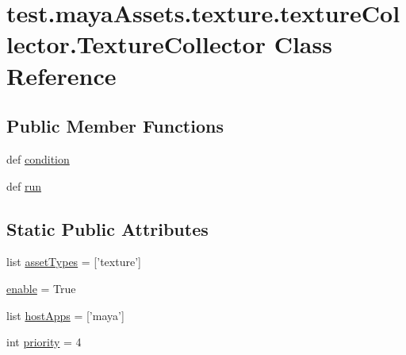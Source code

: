 \hypertarget{classtest_1_1mayaAssets_1_1texture_1_1textureCollector_1_1TextureCollector}{\section{test.\-maya\-Assets.\-texture.\-texture\-Collector.\-Texture\-Collector \-Class \-Reference}
\label{d3/df4/classtest_1_1mayaAssets_1_1texture_1_1textureCollector_1_1TextureCollector}
}
\subsection*{\-Public \-Member \-Functions}
\begin{DoxyCompactItemize}
\item 
def \hyperlink{classtest_1_1mayaAssets_1_1texture_1_1textureCollector_1_1TextureCollector_a47a29bc1fda22a8625f46b6a2f9d89d4}{condition}
\item 
def \hyperlink{classtest_1_1mayaAssets_1_1texture_1_1textureCollector_1_1TextureCollector_a03528e6f0bcecb42ba7e6e31ae97a3c6}{run}
\end{DoxyCompactItemize}
\subsection*{\-Static \-Public \-Attributes}
\begin{DoxyCompactItemize}
\item 
list \hyperlink{classtest_1_1mayaAssets_1_1texture_1_1textureCollector_1_1TextureCollector_a21c84853680ff51baeac18809f014283}{asset\-Types} = \mbox{[}'texture'\mbox{]}
\item 
\hyperlink{classtest_1_1mayaAssets_1_1texture_1_1textureCollector_1_1TextureCollector_adb057dee14751ddadaa19c99e9129bba}{enable} = \-True
\item 
list \hyperlink{classtest_1_1mayaAssets_1_1texture_1_1textureCollector_1_1TextureCollector_af2b3c1ee7d40a707f8474877c99ee4f5}{host\-Apps} = \mbox{[}'maya'\mbox{]}
\item 
int \hyperlink{classtest_1_1mayaAssets_1_1texture_1_1textureCollector_1_1TextureCollector_adf2db616fa4b6180b9f08b2cde3a9c16}{priority} = 4
\end{DoxyCompactItemize}


